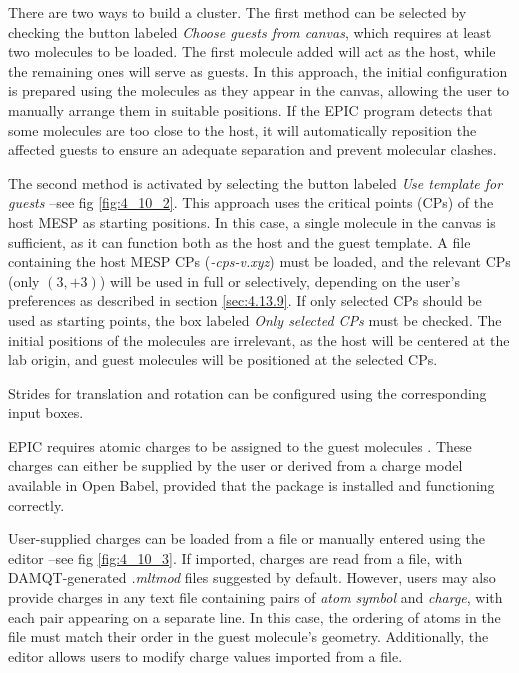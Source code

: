 \documentclass[10pt]{article}
\begin{document}
\vspace*{5mm}

There are two ways to build a cluster. The first method can be selected by  
checking the button labeled {\it Choose guests from canvas}, which requires at  
least two molecules to be loaded. The first molecule added will act as the host,  
while the remaining ones will serve as guests. In this approach, the initial  
configuration is prepared using the molecules as they appear in the canvas,  
allowing the user to manually arrange them in suitable positions. If the EPIC  
program detects that some molecules are too close to the host, it will  
automatically reposition the affected guests to ensure an adequate separation  
and prevent molecular clashes.  

The second method is activated by selecting the button labeled  
{\it Use template for guests} --see fig \ref{fig:4_10_2}. This approach  
uses the critical points (CPs) of the host MESP as starting positions. In this  
case, a single molecule in the canvas is sufficient, as it can function both as  
the host and the guest template. A file containing the host MESP CPs  
({\it *-cps-v.xyz}) must be loaded, and the relevant CPs (only $(3,+3)$)  
will be used in full or selectively, depending on the user's preferences as  
described in section \ref{sec:4.13.9}. If only selected CPs should be used as  
starting points, the box labeled {\it Only selected CPs} must be checked. The  
initial positions of the molecules are irrelevant, as the host will be centered  
at the lab origin, and guest molecules will be positioned at the selected CPs.  

Strides for translation and rotation can be configured using the corresponding  
input boxes.  

EPIC requires atomic charges to be assigned to the guest molecules  
. These charges can either be supplied  
by the user or derived from a charge model available in Open Babel, provided that  
the package is installed and functioning correctly.  

User-supplied charges can be loaded from a file or manually entered using the  
editor --see fig \ref{fig:4_10_3}. If imported, charges are read from a file,  
with DAMQT-generated {\it .mltmod} files suggested by default. However, users  
may also provide charges in any text file containing pairs of {\it atom symbol}  
and {\it charge}, with each pair appearing on a separate line. In this case, the  
ordering of atoms in the file must match their order in the guest molecule's  
geometry. Additionally, the editor allows users to modify charge values imported  
from a file.  
\end{document}
